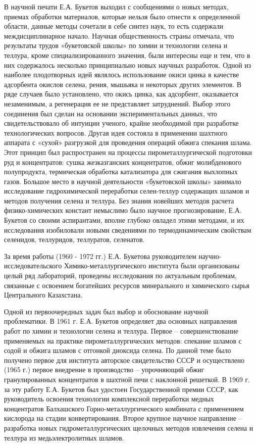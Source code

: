 В научной печати Е.А. Букетов выходил с сообщениями о новых методах,
приемах обработки материалов, которые нельзя было отнести к определенной
области, данные методы сочетали в себе синтез наук, то есть содержали
междисциплинарное начало. Научная общественность страны отмечала, что
результаты трудов «букетовской школы» по химии и технологии селена и
теллура, кроме специализированного значения, были интересны еще и тем,
что в них содержалось несколько принципиально новых научных разработок.
Одной из наиболее плодотворных идей являлось использование окиси цинка в
качестве адсорбента окислов селена, рения, мышьяка и некоторых других
элементов. В ряде случаев было установлено, что окись цинка, как
адсорбент, оказывается незаменимым, а регенерация ее не представляет
затруднений. Выбор этого соединения был сделан на основании
экспериментальных данных, что свидетельствовало об интуиции ученого,
крайне необходимой при разработке технологических вопросов. Другая идея
состояла в применении шахтного аппарата с «сухой» разгрузкой для
проведения операций обжига спекания шлама. Этот принцип был
распространен на процессы пирометаллургической подготовки руд и
концентратов: сушка жезказганских концентратов, обжиг молибденового
полупродукта, термическая обработка катализатора для сжигания выхлопных
газов. Большое место в научной деятельности «букетовской школы» занимало
исследование гидрохимической переработки селен-теллур содержащих шламов
и методов получения селена и теллура. Без знания новейших методов
расчета физико-химических констант немыслимо было научное
прогнозирование, Е.А. Букетов со своими аспирантами, вполне глубоко
овладел этими методами, и их исследования изобиловали новыми сведениями
по термодинамическим свойствам селенидов, теллуридов, теллуратов,
селенатов.

За время работы (1960 - 1972 гг.) Е.А. Букетова руководителем
научно-исследовательского Химико-металлургического института были
организованы целый ряд лабораторий, проведены исследования по актуальным
проблемам, связанные с освоением богатейших ресурсов минерального и
химического сырья Центрального Казахстана.

Одной из первоочередных задач был выбор и обоснование научной
проблематики. В 1961 г. Е.А. Букетов определяет два основных направления
работ по химии и технологии селена и теллура. Первое --
совершенствование применяемых на практике пирометаллургических методов:
спекание шламов с содой и обжига шламов с отгонкой диоксида селена. По
данной теме было получено первое для института авторское свидетельство
СССР и осуществлено (1965 г.) первое внедрение в производство --
упрочняющий обжиг гранулированных концентратов в шахтной печи с
наклонной решеткой. В 1969 г. за эту работу Е.А. Букетов был удостоен
Государственной премии СССР, как руководитель освоения технологии
комплексной переработки медных концентратов Балхашского
Горно-металлургического комбината с применением кислорода на стадии
конвертирования. Второе крупное научное направление -- разработка новых
гидрометаллургических щелочных методов извлечения селена и теллура из
медьэлектролитных шламов.

